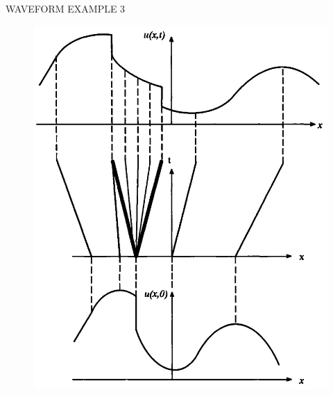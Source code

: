 \documentclass{beamer}
\begin{document}
\begin{frame}{WAVEFORM EXAMPLE 3}
  \begin{figure}
   \includegraphics[scale=0.20]{figures/Creation.jpg}
  \end{figure}
\end{frame}



  
\end{document}
